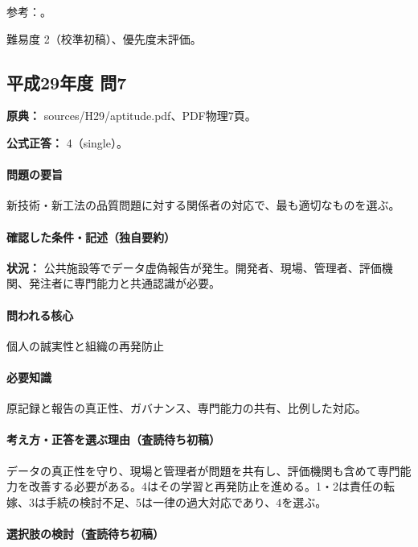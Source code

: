 \par 参考：\cite{ipej_ethics2011}。

\par 難易度 2（校準初稿）、優先度未評価。

\subsection{平成29年度 問7}
\label{q:h29-reg-apt-07}

\noindent\textbf{原典：} sources/H29/aptitude.pdf、PDF物理7頁。

\textbf{公式正答：} 4（single）。

\paragraph{問題の要旨} 新技術・新工法の品質問題に対する関係者の対応で、最も適切なものを選ぶ。

\paragraph{確認した条件・記述（独自要約）}\mbox{}\par

\noindent\textbf{状況：} 公共施設等でデータ虚偽報告が発生。開発者、現場、管理者、評価機関、発注者に専門能力と共通認識が必要。\par

\paragraph{問われる核心} 個人の誠実性と組織の再発防止

\paragraph{必要知識} 原記録と報告の真正性、ガバナンス、専門能力の共有、比例した対応。

\paragraph{考え方・正答を選ぶ理由（査読待ち初稿）} データの真正性を守り、現場と管理者が問題を共有し、評価機関も含めて専門能力を改善する必要がある。4はその学習と再発防止を進める。1・2は責任の転嫁、3は手続の検討不足、5は一律の過大対応であり、4を選ぶ。

\paragraph{選択肢の検討（査読待ち初稿）}\mbox{}\par

